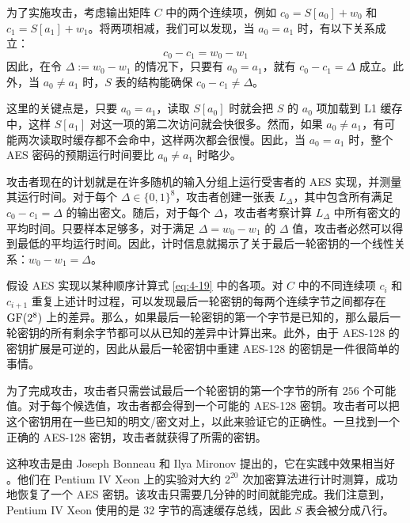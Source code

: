 为了实施攻击，考虑输出矩阵 $C$ 中的两个连续项，例如 $c_0=S[a_0]+w_0$ 和 $c_1=S[a_1]+w_1$。将两项相减，我们可以发现，当 $a_0=a_1$ 时，有以下关系成立：
\[
c_0-c_1=w_0-w_1
\]
因此，在令 $\Delta:=w_0-w_1$ 的情况下，只要有 $a_0=a_1$，就有 $c_0-c_1=\Delta$ 成立。此外，当 $a_0\neq a_1$ 时，$S$ 表的结构能确保 $c_0-c_1\neq\Delta$。

这里的关键点是，只要 $a_0=a_1$，读取 $S[a_0]$ 时就会把 $S$ 的 $a_0$ 项加载到 L1 缓存中，这样 $S[a_1]$ 对这一项的第二次访问就会快很多。然而，如果 $a_0\neq a_1$，有可能两次读取时缓存都不会命中，这样两次都会很慢。因此，当 $a_0=a_1$ 时，整个 AES 密码的预期运行时间要比 $a_0\neq a_1$ 时略少。

攻击者现在的计划就是在许多随机的输入分组上运行受害者的 AES 实现，并测量其运行时间。对于每个 $\Delta\in\{0,1\}^8$，攻击者创建一张表 $L_\Delta$，其中包含所有满足 $c_0-c_1=\Delta$ 的输出密文。随后，对于每个 $\Delta$，攻击者考察计算 $L_\Delta$ 中所有密文的平均时间。只要样本足够多，对于满足 $\Delta=w_0-w_1$ 的 $\Delta$ 值，攻击者必然可以得到最低的平均运行时间。因此，计时信息就揭示了关于最后一轮密钥的一个线性关系：$w_0-w_1=\Delta$。

假设 AES 实现以某种顺序计算式 \ref{eq:4-19} 中的各项。对 $C$ 中的不同连续项 $c_i$ 和 $c_{i+1}$ 重复上述计时过程，可以发现最后一轮密钥的每两个连续字节之间都存在 ${\rm GF}(2^8)$ 上的差异。那么，如果最后一轮密钥的第一个字节是已知的，那么最后一轮密钥的所有剩余字节都可以从已知的差异中计算出来。此外，由于 AES-128 的密钥扩展是可逆的，因此从最后一轮密钥中重建 AES-128 的密钥是一件很简单的事情。

为了完成攻击，攻击者只需尝试最后一个轮密钥的第一个字节的所有 $256$ 个可能值。对于每个候选值，攻击者都会得到一个可能的 AES-128 密钥。攻击者可以把这个密钥用在一些已知的明文/密文对上，以此来验证它的正确性。一旦找到一个正确的 AES-128 密钥，攻击者就获得了所需的密钥。

这种攻击是由 Joseph Bonneau 和 Ilya Mironov 提出的，它在实践中效果相当好 \cite{bonneau2006cache}。他们在 Pentium IV Xeon 上的实验对大约 $2^{20}$ 次加密算法进行计时测算，成功地恢复了一个 AES 密钥。该攻击只需要几分钟的时间就能完成。我们注意到，Pentium IV Xeon 使用的是 $32$ 字节的高速缓存总线，因此 $S$ 表会被分成八行。

